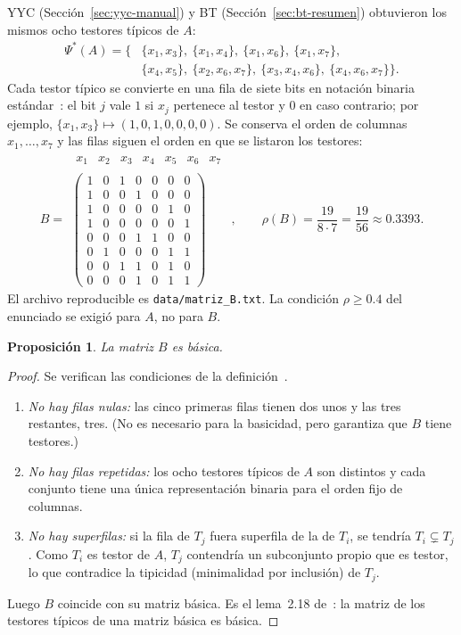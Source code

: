 \documentclass[11pt, a4paper]{article}
\theoremstyle{definition}
\theoremstyle{plain}
\newtheorem{proposicion}{Proposición}
\newcommand{\Psis}{\Psi^{*}}
\newcommand{\x}[1]{x_{#1}}
\newcommand{\cj}[1]{\{#1\}}
\begin{document}
YYC (Sección~\ref{sec:yyc-manual}) y BT (Sección~\ref{sec:bt-resumen}) obtuvieron
los mismos ocho testores típicos de $A$:
\[
\begin{aligned}
\Psis(A)=\big\{&\cj{\x1,\x3},\ \cj{\x1,\x4},\ \cj{\x1,\x6},\ \cj{\x1,\x7},\\
&\cj{\x4,\x5},\ \cj{\x2,\x6,\x7},\ \cj{\x3,\x4,\x6},\ \cj{\x4,\x6,\x7}\big\}.
\end{aligned}
\]
Cada testor típico se convierte en una fila de siete bits en notación binaria
estándar~\cite{proyecto}: el bit $j$ vale $1$ si $\x j$ pertenece al testor y $0$ en
caso contrario; por ejemplo, $\cj{\x1,\x3}\mapsto(1,0,1,0,0,0,0)$. Se conserva el
orden de columnas $\x1,\ldots,\x7$ y las filas siguen el orden en que se listaron
los testores:
\[
B=\begin{array}{c}
\begin{array}{ccccccc} \x1&\x2&\x3&\x4&\x5&\x6&\x7\end{array}\\
\begin{pmatrix}
1&0&1&0&0&0&0\\
1&0&0&1&0&0&0\\
1&0&0&0&0&1&0\\
1&0&0&0&0&0&1\\
0&0&0&1&1&0&0\\
0&1&0&0&0&1&1\\
0&0&1&1&0&1&0\\
0&0&0&1&0&1&1
\end{pmatrix}
\end{array},\qquad
\rho(B)=\frac{19}{8\cdot7}=\frac{19}{56}\approx0.3393 .
\]
El archivo reproducible es \texttt{data/matriz\_B.txt}. La condición
$\rho\ge0.4$ del enunciado se exigió para $A$, no para $B$.

\begin{proposicion}\label{prop:Bbasica}
La matriz $B$ es básica.
\end{proposicion}
\begin{proof}
Se verifican las condiciones de la definición~\cite{shul82,guevara}.
\begin{enumerate}[nosep]
\item \emph{No hay filas nulas:} las cinco primeras filas tienen dos unos y las
  tres restantes, tres. (No es necesario para la basicidad, pero garantiza que
  $B$ tiene testores.)
\item \emph{No hay filas repetidas:} los ocho testores típicos de $A$ son
  distintos y cada conjunto tiene una única representación binaria para el orden
  fijo de columnas.
\item \emph{No hay superfilas:} si la fila de $T_j$ fuera superfila de la de
  $T_i$, se tendría $T_i\subsetneq T_j$. Como $T_i$ es testor de $A$, $T_j$
  contendría un subconjunto propio que es testor, lo que contradice la tipicidad
  (minimalidad por inclusión) de $T_j$.
\end{enumerate}
Luego $B$ coincide con su matriz básica. Es el lema~2.18 de~\cite{guevara}: la
matriz de los testores típicos de una matriz básica es básica.
\end{proof}
\end{document}
